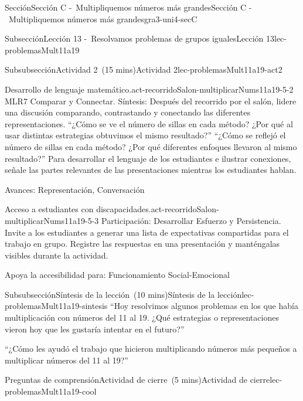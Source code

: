 \documentclass[oneside,10pt,]{article}
\begin{document}
\begin{sectionptx}{Sección}{Sección C -~Multipliquemos números más grandes}{}{Sección C -~Multipliquemos números más grandes}{}{}{gra3-uni4-secC}
\begin{subsectionptx}{Subsección}{Lección 13 -~Resolvamos problemas de grupos iguales}{}{Lección 13}{}{}{lec-problemasMult11a19}
\begin{subsubsectionptx}{Subsubsección}{Actividad 2~(15 mins)}{}{Actividad 2}{}{}{lec-problemasMult11a19-act2}
\begin{paragraphs}{Desarrollo de lenguaje matemático.}{act-recorridoSalon-multiplicarNums11a19-5-2}
MLR7 Comparar y Connectar. Síntesis: Después del recorrido por el salón, lidere una discusión comparando, contrastando y conectando las diferentes representaciones. ``¿Cómo se ve el número de sillas en cada método? ¿Por qué al usar distintas estrategias obtuvimos el mismo resultado?'' ``¿Cómo se reflejó el número de sillas en cada método? ¿Por qué diferentes enfoques llevaron al mismo resultado?'' Para desarrollar el lenguaje de los estudiantes e ilustrar conexiones, señale las partes relevantes de las presentaciones mientras los estudiantes hablan.%
\par
Avances: Representación, Conversación%
\end{paragraphs}%
\begin{paragraphs}{Acceso a estudiantes con discapacidades.}{act-recorridoSalon-multiplicarNums11a19-5-3}%
Participación: Desarrollar Esfuerzo y Persistencia. Invite a los estudiantes a generar una lista de expectativas compartidas para el trabajo en grupo. Registre las respuestas en una presentación y manténgalas visibles durante la actividad.%
\par
Apoya la accesibilidad para: Funcionamiento Social-Emocional%
\end{paragraphs}%
\end{subsubsectionptx}
%
%
\typeout{************************************************}
\typeout{************************************************}
%
\begin{subsubsectionptx}{Subsubsección}{Síntesis de la lección~(10 mins)}{}{Síntesis de la lección}{}{}{lec-problemasMult11a19-sintesis}
``Hoy resolvimos algunos problemas en los que había multiplicación con números del 11 al 19. ¿Qué estrategias o representaciones vieron hoy que les gustaría intentar en el futuro?''%
\par
``¿Cómo les ayudó el trabajo que hicieron multiplicando números más pequeños a multiplicar números del 11 al 19?''%
\end{subsubsectionptx}
%
%
\typeout{************************************************}
\typeout{************************************************}
%
\begin{reading-questions-subsubsection}{Preguntas de comprensión}{Actividad de cierre~(5 mins)}{}{Actividad de cierre}{}{}{lec-problemasMult11a19-cool}

\end{reading-questions-subsubsection}
\end{subsectionptx}
\end{sectionptx}
\end{document}
